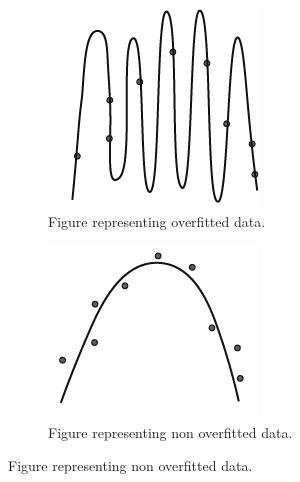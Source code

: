 \begin{figure}[ht]
\begin{subfigure}[b]{0.24\textwidth}
\includegraphics[width=\textwidth]{polymOverfit}
\caption{Figure representing overfitted data.}\label{fig:polymOverfit}
\end{subfigure}
\hfill
\begin{subfigure}[b]{0.24\textwidth}
\centering
\includegraphics[width=\textwidth]{polymNotOverfit}
\caption{Figure representing non overfitted data.}\label{fig:polymNotOverfit}
\end{subfigure}

\end{figure}
